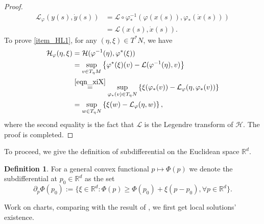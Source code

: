 \documentclass[a4paper]{article}
\numberwithin{equation}{section}
\theoremstyle{definition}
\newtheorem{definition}[theorem]{Definition}
\begin{document}
\begin{proof}
	\begin{align*}
		\mathcal{L}_{\varphi}(y(s),\dot{y}(s))&=\mathcal{L}\circ \varphi^{-1}_{*}(\varphi(x(s)),\varphi_{*}(\dot{x}(s)))\\
		&=\mathcal{L}(x(s),\dot{x}(s)).
	\end{align*}
	To prove \cref{item_HL1}, for any $(\eta,\xi)\in T^*N$, we have
	\begin{align*}
		\mathcal{H}_\varphi(\eta,\xi)&=\mathcal{H}(\varphi^{-1}(\eta),\varphi^*(\xi))\\
		&=\sup_{v\in T_\eta M}\left\{\varphi^*(\xi)(v)-\mathcal{L}(\varphi^{-1}(\eta),v)\right\}\\
		&\overset{\eqref{eqn_xiX}}{=}\sup_{\varphi_*(v)\in T_{\eta}N}\left\{\xi(\varphi_*(v))-\mathcal{L}_\varphi(\eta ,\varphi_*(v))\right\}\\
		&=\sup_{w\in T_{\eta}N}\left\{\xi(w)-\mathcal{L}_\varphi(\eta,w)\right\},
	\end{align*}
	where the second equality is the fact that $\mathcal{L}$ is the Legendre transform of $\mathcal{H}$. 
	The proof is completed.
\end{proof}	
To proceed, we give the definition of subdifferential on the Euclidean space $\mathbb{R}^d$.
\begin{definition}
	For a general convex functional $p \mapsto \Phi(p)$ we denote the subdifferential at $p_0\in \mathbb{R}^d$ as the set
	\begin{equation*}
		\partial_p\Phi(p_0):=\{\xi \in \mathbb{R}^d:\Phi(p)\geq \Phi(p_0)+\xi(p-p_0),\forall p\in \mathbb{R}^d\}.
	\end{equation*}
\end{definition}
Work on charts, comparing with the result of , we first get local solutions' existence.
\end{document}
